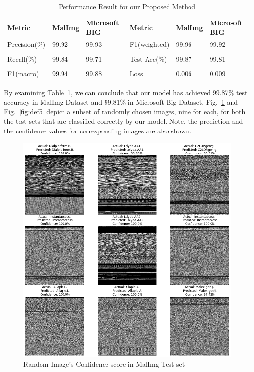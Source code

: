 \documentclass[pdflatex,sn-mathphys]{sn-jnl}%
\begin{document}
\begin{table}[tb]
    \centering
	\caption{Performance Result for our Proposed Method}
	
	\begin{tabular}{|p{2cm}||p{1.5cm}||p{1.5cm}||p{2cm}||p{1.5cm}||p{1.5cm}|}
		\cmidrule{1-6}
		\textbf{Metric} & \textbf{MalImg} & \textbf{Microsoft BIG} & \textbf{Metric} & \textbf{MalImg} & \textbf{Microsoft BIG}\\
        \cmidrule{1-6}
		Precision(\%)  &  99.92 & 99.93 & F1(weighted) &  99.96 & 99.92 \\\\
		Recall(\%) & 99.84 & 99.71 & Test-Acc(\%)  & 99.87 & 99.81\\\\
		F1(macro) &  99.94 & 99.88 & Loss & 0.006 & 0.009\\
		\hline
	\end{tabular}
	\label{metric}
\end{table}

By examining Table~\ref{metric}, we can conclude that our model has achieved 99.87\% test accuracy in MalImg Dataset and 99.81\% in Microsoft Big Dataset. Fig.~\ref{fig:def4} and Fig.~\ref{fig:def5} depict a subset of randomly chosen images, nine for each, for both the test-sets that are classified correctly by our model. Note, the prediction and the confidence values for corresponding images are also shown. 

\begin{figure}[tb]
\centering
    \captionsetup{justification=centering}
    \includegraphics[width=1\textwidth]{malIMG.png}
	\caption{ Random Image's  Confidence score in MalImg Test-set}
	\label{fig:def4}
\end{figure}
 
\end{document}
